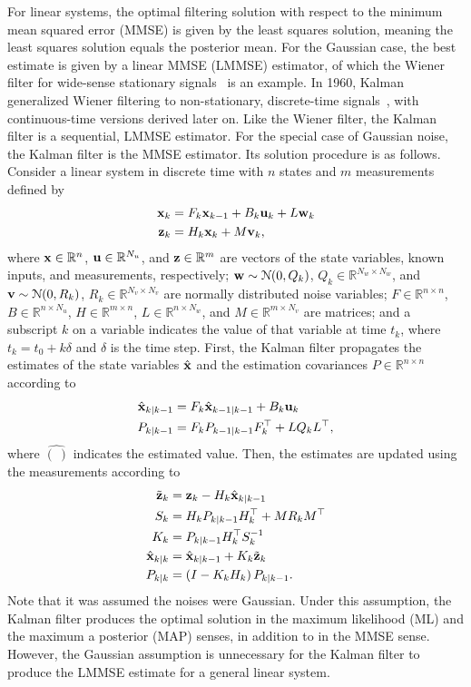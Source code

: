 \documentclass[../zhang_thesis.tex]{subfiles}
\begin{document}
For linear systems, the optimal filtering solution with respect to the minimum mean squared error (MMSE) is given by the least squares solution, meaning the least squares solution equals the posterior mean. For the Gaussian case, the best estimate is given by a linear MMSE (LMMSE) estimator, of which the Wiener filter for wide-sense stationary signals~\cite{wiener49} is an example. In 1960, Kalman generalized Wiener filtering to non-stationary, discrete-time signals~\cite{kalman60}, with continuous-time
versions derived later on. Like the Wiener filter, the Kalman filter is a sequential, LMMSE estimator. For the special case of Gaussian noise, the Kalman filter is the MMSE estimator. Its solution procedure is as follows. Consider a linear system in discrete time with $n$ states and $m$ measurements defined by
\begin{align}
    \mathbf{x}_k &= F_k \mathbf{x}_{k-1} + B_k \mathbf{u}_k + L \mathbf{w}_k \\
    \mathbf{z}_k &= H_k \mathbf{x}_k + M \mathbf{v}_k,
\end{align}
where $\mathbf{x}\in\mathbb{R}^n$, $\mathbf{u}\in\mathbb{R}^{N_u}$, and $\mathbf{z}\in\mathbb{R}^m$ are vectors of the state variables, known inputs, and measurements, respectively; $\mathbf{w}\sim\mathcal{N}(0,Q_k)$, $Q_k\in\mathbb{R}^{N_w\times N_w}$, and $\mathbf{v}\sim\mathcal{N}(0,R_k)$, $R_k\in\mathbb{R}^{N_v\times N_v}$ are normally distributed noise variables; $F\in\mathbb{R}^{n\times n}$, $B\in\mathbb{R}^{n\times N_u}$, $H\in\mathbb{R}^{m\times n}$, $L\in\mathbb{R}^{n\times N_w}$, and $M\in\mathbb{R}^{m\times N_v}$ are matrices; and a subscript $k$ on a
variable indicates the value of that variable at time $t_k$, where $t_k=t_0+k\delta$ and $\delta$ is the time step. First, the Kalman filter propagates the estimates of the state variables $\hat{\mathbf{x}}$ and the estimation covariances $P\in\mathbb{R}^{n\times n}$ according to
\begin{align}
    \hat{\mathbf{x}}_{k|k-1} &= F_k \hat{\mathbf{x}}_{k-1|k-1} + B_k \mathbf{u}_k \label{eq:kfp1} \\
    P_{k|k-1} &= F_k P_{k-1|k-1} F_k^\top + L Q_k L^\top, \label{eq:kfp2}
\end{align}
where $\hat{(\ )}$ indicates the estimated value. Then, the estimates are updated using the measurements according to
\begin{align}
    \tilde{\mathbf{z}}_k &= \mathbf{z}_k - H_k \hat{\mathbf{x}}_{k|k-1} \label{eq:kfu1} \\
    S_k &= H_k P_{k|k-1} H_k^\top + M R_k M^\top \\
    K_k &= P_{k|k-1} H_k^\top S_k^{-1} \\
    \hat{\mathbf{x}}_{k|k} &= \hat{\mathbf{x}}_{k|k-1} + K_k \tilde{\mathbf{z}}_k \\
    P_{k|k} &= \left( I - K_k H_k \right) P_{k|k-1}. \label{eq:kful} 
\end{align}
Note that it was assumed the noises were Gaussian. Under this assumption, the Kalman filter produces the optimal solution in the maximum likelihood (ML) and the maximum a posterior (MAP) senses, in addition to in the MMSE sense. However, the Gaussian assumption is unnecessary for the Kalman filter to produce the LMMSE estimate for a general linear system.
\end{document}
